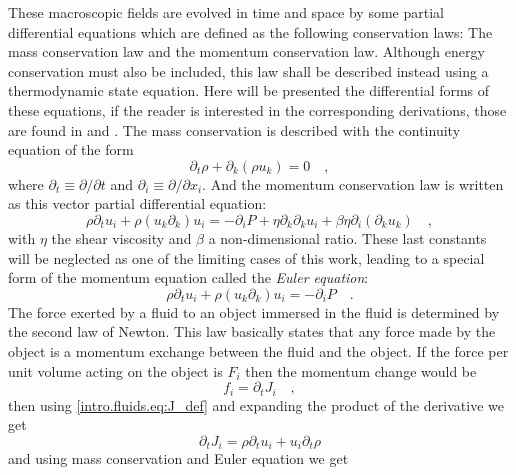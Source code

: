 These macroscopic fields are evolved in time and space by some partial differential equations which are defined as the following conservation laws: The mass conservation law and the momentum conservation law. Although energy conservation must also be included, this law shall be described instead using a thermodynamic state equation. Here will be presented the differential forms of these equations, if the reader is interested in the corresponding derivations, those are found in \cite{Landau} and \cite{Bruus_book}. The mass conservation is described with the continuity equation of the form
\begin{equation}\label{intro.fluids.eq:mass_conservation}
    \partial_t\rho + \partial_k(\rho u_k) = 0\quad,
\end{equation} 
where $\partial_t\equiv\partial/\partial t$ and  $\partial_i\equiv\partial/\partial x_i$. And the momentum conservation law is written as this vector partial differential equation:
\begin{equation}\label{intro.fluids.eq:momentum_conservation_law}
    \rho\partial_t u_i + \rho( u_k\partial_k)u_i = -\partial_i P + \eta\partial_k\partial_k u_i + \beta\eta\partial_i(\partial_k u_k)\quad,
\end{equation}
with $\eta$ the shear viscosity and $\beta$ a non-dimensional ratio. These last constants will be neglected as one of the limiting cases of this work, leading to a special form of the momentum equation called the \textit{Euler equation}:
\begin{equation}\label{intro.fluids.eq:euler_equation}
    \rho\partial_t u_i + \rho( u_k\partial_k)u_i = -\partial_i P \quad. 
\end{equation}
The force exerted by a fluid to an object immersed in the fluid is determined by the second law of Newton. This law basically states that any force made by the object is a momentum exchange between the fluid and the object. If the force per unit volume acting on the object is $F_i$ then the momentum change would be
\begin{equation}\label{intro.fluids.eq:force_fluid_def}
    f_i = \partial_t J_i\quad,
\end{equation}
then using \ref{intro.fluids.eq:J_def} and expanding the product of the derivative we get
\begin{equation}\label{intro.fluids.eq:F_expand_derivative}
    \partial_t J_i = \rho\partial_t u_i + u_i \partial_t\rho 
\end{equation}
and using mass conservation and Euler equation we get
